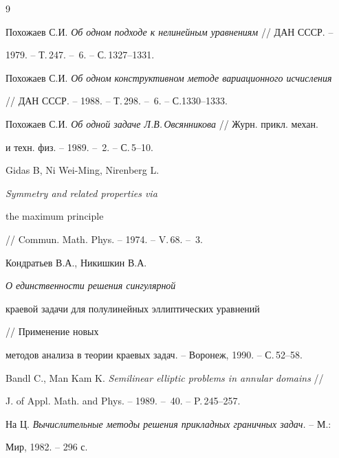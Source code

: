 \begin{thebibliography}{9} 


 




Похожаев С.И. {\em Об одном подходе к нелинейным уравнениям} // ДАН СССР. -- 


1979. -- Т.\,247. -- \No\,6. -- С.\,1327--1331. 


 




Похожаев С.И. {\em Об одном конструктивном методе вариационного исчисления} 


// ДАН СССР. -- 1988. -- Т.\,298. -- \No\,6. -- С.1330--1333. 


 




Похожаев С.И. {\em Об одной задаче Л.В.\,Овсянникова} // Журн. прикл. механ. 


и техн. физ. -- 1989. -- \No\,2. -- С.\,5--10. 


 




Gidas B, Ni Wei-Ming, Nirenberg L. {\em Symmetry and related properties via 


the maximum principle} // Commun. Math. Phys. -- 1974. -- V.\,68. -- \No\,3. 


 




Кондратьев В.А., Никишкин В.А. {\em О единственности решения сингулярной 


краевой задачи для полулинейных эллиптических уравнений} // Применение новых 


методов анализа в теории краевых задач. -- Воронеж, 1990. -- С.\,52--58. 


 




Bandl C., Man Kam K. {\em Semilinear elliptic problems in annular domains} // 


J. of Appl. Math. and Phys. -- 1989. -- \No\,40. -- P.\,245--257. 


 




На Ц. {\em Вычислительные методы решения прикладных граничных задач.} -- М.: 


Мир, 1982. -- 296 с. 


 


\end{thebibliography} 


 


\vskip 1cm 


 






 


 



